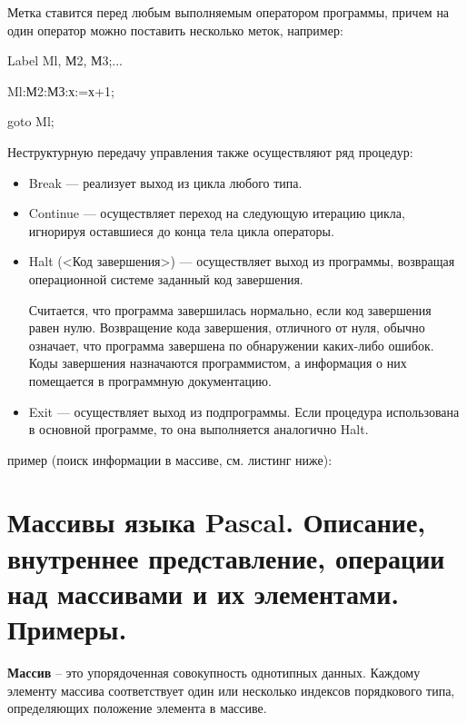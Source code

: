Метка ставится перед любым выполняемым оператором программы, причем на один оператор можно поставить несколько меток, например:

Label Ml, М2, М3;...

Ml:М2:МЗ:х:=х+1;

goto Ml;

Неструктурную передачу управления также осуществляют ряд процедур:
\begin{itemize}
\item Break — реализует выход из цикла любого типа.

\item Continue — осуществляет переход на следующую итерацию цикла, игнорируя оставшиеся до конца тела цикла операторы.

\item Halt (<Код завершения>) — осуществляет выход из программы, возвращая операционной системе заданный код завершения. 

Считается, что программа завершилась нормально, если код завершения равен нулю. Возвращение кода завершения, отличного от нуля, обычно означает, что программа завершена по обнаружении каких-либо ошибок. Коды завершения назначаются программистом, а информация о них помещается в программную документацию.



\item Exit — осуществляет выход из подпрограммы. Если процедура использована в основной программе, то она выполняется аналогично Halt.

\end{itemize}

пример (поиск информации в массиве, см. листинг ниже): 





\newpage\section{Массивы языка Pascal. Описание, внутреннее представление, операции над массивами и 
их элементами. Примеры. }

\begin{myquote}
\end{myquote}

{\bf{Массив}} – это упорядоченная совокупность однотипных данных. Каждому элементу массива соответствует один или несколько индексов порядкового типа, определяющих положение элемента в массиве.

